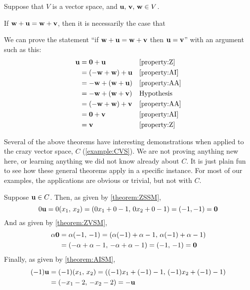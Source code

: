 \documentclass{ximera}
\begin{document}
\begin{exercise}
  Suppose that $V$ is a vector space, and $\mathbf{u},\,\mathbf{v},\,\mathbf{w}\in V$.

  If $\mathbf{w}+\mathbf{u}=\mathbf{w}+\mathbf{v}$, then it is necessarily the case that
  \begin{multipleChoice}
  \end{multipleChoice}
  
  \begin{feedback}[correct]
    We can prove the statement ``if
    $\mathbf{w}+\mathbf{u}=\mathbf{w}+\mathbf{v}$ then $\mathbf{u}=\mathbf{v}$''
    with an argument such as this:
    \begin{align*}
      \mathbf{u}
      &=\mathbf{0}+\mathbf{u}&&\ref{property:Z}\\
      &=\left(\mathbf{-w}+\mathbf{w}\right)+\mathbf{u}&&\ref{property:AI}\\
      &=\mathbf{-w}+\left(\mathbf{w}+\mathbf{u}\right)&&\ref{property:AA}\\
      &=\mathbf{-w}+\left(\mathbf{w}+\mathbf{v}\right)&&\text{Hypothesis}\\
      &=\left(\mathbf{-w}+\mathbf{w}\right)+\mathbf{v}&&\ref{property:AA}\\
      &=\mathbf{0}+\mathbf{v}&&\ref{property:AI}\\
      &=\mathbf{v}&&\ref{property:Z}
    \end{align*}
  \end{feedback}
\end{exercise}

\begin{example}
  Several of the above theorems have interesting demonstrations when
  applied to the crazy vector space, $C$ (\ref{example:CVS}).  We are
  not proving anything new here, or learning anything we did not know
  already about $C$.  It is just plain fun to see how these general
  theorems apply in a specific instance.  For most of our examples,
  the applications are obvious or trivial, but not with $C$.

  Suppose $\mathbf{u}\in C$.  Then, as given by \ref{theorem:ZSSM},
  \[
    0\mathbf{u}=0(x_1,\,x_2)=(0x_1+0-1,\,0x_2+0-1)=(-1,-1)=\mathbf{0}
  \]
  And as given by \ref{theorem:ZVSM},
  \begin{align*}
    \alpha\mathbf{0}
    &=\alpha(-1,\,-1)=(\alpha(-1)+\alpha-1,\,\alpha(-1)+\alpha-1)\\
    &=(-\alpha+\alpha-1,\,-\alpha+\alpha-1)=(-1,\,-1)=\mathbf{0}
  \end{align*}
  Finally, as given by \ref{theorem:AISM},
  \begin{align*}
    (-1)\mathbf{u}
    &=(-1)(x_1,\,x_2)=((-1)x_1+(-1)-1,\,(-1)x_2+(-1)-1)\\
    &=(-x_1-2,\,-x_2-2)=-\mathbf{u}
  \end{align*}
\end{example}
\end{document}

